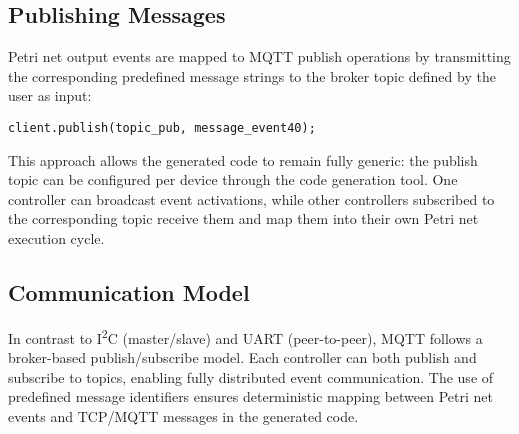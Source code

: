 \subsection{Publishing Messages}
Petri net output events are mapped to MQTT publish operations by transmitting the corresponding predefined message strings to the broker topic defined by the user as input:
\begin{verbatim}
client.publish(topic_pub, message_event40);
\end{verbatim}
This approach allows the generated code to remain fully generic: the publish topic can be configured per device through the code generation tool. One controller can broadcast event activations, while other controllers subscribed to the corresponding topic receive them and map them into their own Petri net execution cycle.

\subsection{Communication Model}
In contrast to I\textsuperscript{2}C (master/slave) and UART (peer-to-peer), MQTT follows a broker-based publish/subscribe model. Each controller can both publish and subscribe to topics, enabling fully distributed event communication. The use of predefined message identifiers ensures deterministic mapping between Petri net events and TCP/MQTT messages in the generated code.
